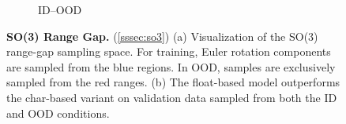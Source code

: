 \begin{figure}
\begin{subfigure}{.5\linewidth}
\caption{ID--OOD}\label{fig:so3_bar}
\end{subfigure}
\caption{\textbf{SO(3) Range Gap.} (\cref{sssec:so3})
(a) Visualization of the SO(3) range-gap sampling space.
For training, Euler rotation components are sampled from the blue regions.
In OOD, samples are exclusively sampled from the red ranges.
(b) The float-based model outperforms the char-based variant on validation data sampled from both the ID and OOD conditions. 
}
\label{fig:so3}
\vspace{-0.5cm}
\end{figure}
